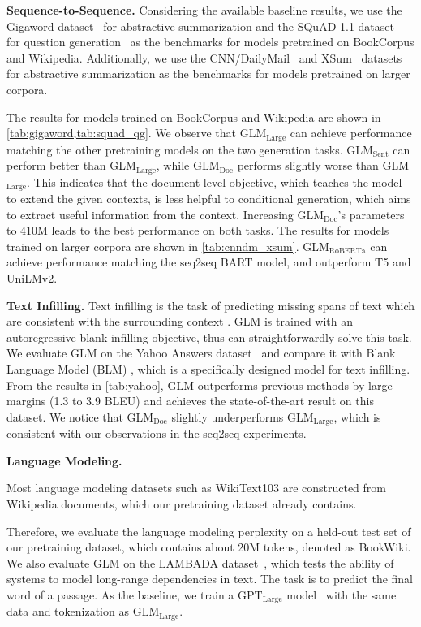 \textbf{Sequence-to-Sequence.}
\label{sec:seq2seq}
Considering the available baseline results, we use the Gigaword dataset~\cite{GigawordRushCW15} for abstractive summarization and the SQuAD 1.1 dataset~\cite{SQuAD:RajpurkarZLL16} for question generation~\cite{NQG:du2017} as the benchmarks for models pretrained on BookCorpus and Wikipedia. Additionally, we use the CNN/DailyMail~\cite{GetPointSummarization2017} and XSum~\cite{XSum2018} datasets for abstractive summarization as the benchmarks for models pretrained on larger corpora. 

The results for models trained on BookCorpus and Wikipedia are shown in \ref{tab:gigaword,tab:squad_qg}. We observe that GLM$_\text{Large}$ can achieve performance matching the other pretraining models on the two generation tasks.
GLM$_\text{Sent}$ can perform better than GLM$_\text{Large}$, while
GLM$_\text{Doc}$ performs slightly worse than GLM$_\text{Large}$. This indicates that the document-level objective, which teaches the model to extend the given contexts, is less helpful to conditional generation, which aims to extract useful information from the context. Increasing GLM$_\text{Doc}$'s parameters to 410M leads to the best performance on both tasks. The results for models trained on larger corpora are shown in \ref{tab:cnndm_xsum}. GLM$_{\text{RoBERTa}}$ can achieve performance matching the seq2seq BART model, and outperform T5 and UniLMv2.

\textbf{Text Infilling.} Text infilling is the task of predicting missing spans of text which are consistent with the surrounding context \cite{TextInfill2019,Fillin2020,BLM2020}. GLM is trained with an autoregressive blank infilling objective, thus can straightforwardly solve this task. We evaluate GLM on the Yahoo Answers dataset~\cite{YahooAnswers} and compare it with Blank Language Model (BLM) \cite{BLM2020}, which is a specifically designed model for text infilling. From the results in \ref{tab:yahoo}, GLM outperforms previous methods by large margins (1.3 to 3.9 BLEU) and achieves the state-of-the-art result on this dataset. We notice that GLM$_\text{Doc}$ slightly underperforms GLM$_\text{Large}$, which is consistent with our observations in the seq2seq experiments.

\textbf{Language Modeling.}

Most language modeling datasets such as WikiText103 are constructed from Wikipedia documents, which our pretraining dataset already contains.

Therefore, we evaluate the language modeling perplexity on a held-out test set of our pretraining dataset, which contains about 20M tokens, denoted as BookWiki. We also evaluate GLM on the LAMBADA dataset~\cite{LAMBADADataset2016}, which tests the ability of systems to model long-range dependencies in text. The task is to predict the final word of a passage. As the baseline, we train a GPT$_\text{Large}$ model~\cite{GPT2-2018,GPT3-2020} with the same data and tokenization as GLM$_\text{Large}$. 

